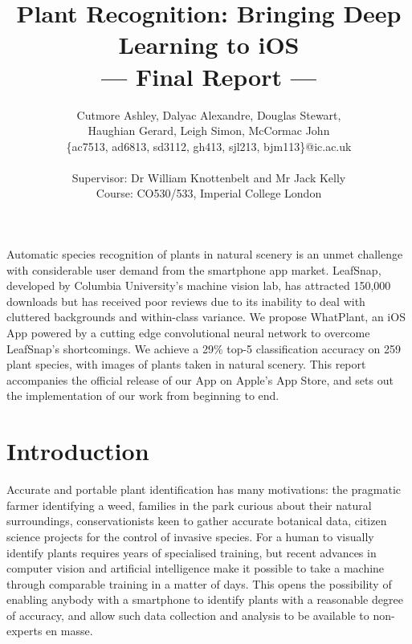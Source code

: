 \documentclass[a4paper,11pt]{article}
\title{Plant Recognition: Bringing Deep Learning to iOS\\\Large{--- Final Report ---}}
\author{Cutmore Ashley, Dalyac Alexandre, Douglas Stewart,\\ Haughian Gerard, Leigh Simon, McCormac John\\
       \{ac7513, ad6813, sd3112, gh413, sjl213, bjm113\}@ic.ac.uk\\ \\
       \small{Supervisor: Dr William Knottenbelt and Mr Jack Kelly}\\
       \small{Course: CO530/533, Imperial College London}
}
\begin{document}
\maketitle

\abstract
{
Automatic species recognition of plants in natural scenery is an unmet challenge with considerable user demand from the smartphone app market. LeafSnap, developed by Columbia University's machine vision lab, has attracted 150,000 downloads but has received poor reviews due to its inability to deal with cluttered backgrounds and within-class variance. We propose WhatPlant, an iOS App powered by a cutting edge convolutional neural network to overcome LeafSnap's shortcomings. We achieve a 29\% top-5 classification accuracy on 259 plant species, with images of plants taken in natural scenery. This report accompanies the official release of our App on Apple's App Store, and sets out the implementation of our work from beginning to end.
}

\clearpage
\tableofcontents
\clearpage

\section{Introduction}

Accurate and portable plant identification has many motivations: the pragmatic farmer identifying a weed, families in the park curious about their natural surroundings, conservationists keen to gather accurate botanical data, citizen science projects for the control of invasive species. For a human to visually identify plants requires years of specialised training, but recent advances in computer vision and artificial intelligence make it possible to take a machine through comparable training in a matter of days. This opens the possibility of enabling anybody with a smartphone to identify plants with a reasonable degree of accuracy, and allow such data collection and analysis to be available to non-experts en masse.
\end{document}
